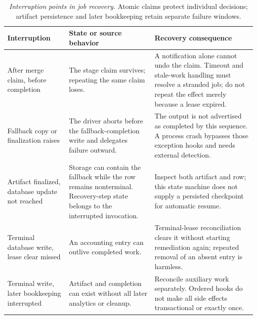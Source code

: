 

{\footnotesize
\begin{longtable}{@{}p{.25\linewidth}p{.33\linewidth}p{.34\linewidth}@{}}
\caption[Interruption points in job recovery]{\emph{Interruption points in job recovery.} Atomic claims protect individual decisions; artifact persistence and later bookkeeping retain separate failure windows.}\label{handbook-job-recovery-failures}\\
\toprule
\textbf{Interruption} & \textbf{State or source behavior} & \textbf{Recovery consequence} \\
\midrule\endhead
After merge claim, before completion & The stage claim survives; repeating the same claim loses. & A notification alone cannot undo the claim. Timeout and stale-work handling must resolve a stranded job; do not repeat the effect merely because a lease expired. \\
Fallback copy or finalization raises & The driver aborts before the fallback-completion write and delegates failure outward. & The output is not advertised as completed by this sequence. A process crash bypasses those exception hooks and needs external detection. \\
Artifact finalized, database update not reached & Storage can contain the fallback while the row remains nonterminal. Recovery-step state belongs to the interrupted invocation. & Inspect both artifact and row; this state machine does not supply a persisted checkpoint for automatic resume. \\
Terminal database write, lease clear missed & An accounting entry can outlive completed work. & Terminal-lease reconciliation clears it without starting remediation again; repeated removal of an absent entry is harmless. \\
Terminal write, later bookkeeping interrupted & Artifact and completion can exist without all later analytics or cleanup. & Reconcile auxiliary work separately. Ordered hooks do not make all side effects transactional or exactly once. \\
\bottomrule
\end{longtable}
}



